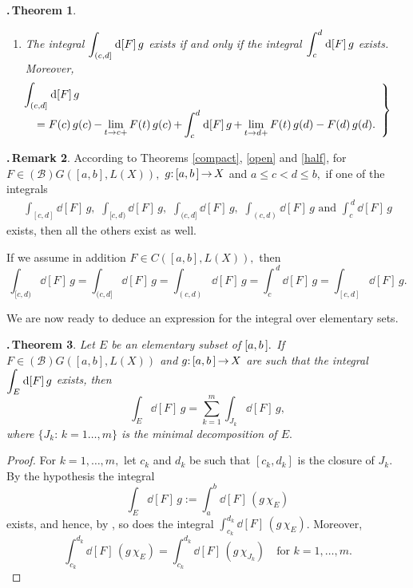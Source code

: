 \documentclass[12pt,twoside]{article}
\numberwithin{equation}{section}
\theoremstyle{plain}
\newtheorem{theorem}{\hskip-1mm.\,Theorem}[section]
\theoremstyle{definition}
\newtheorem{remark}[theorem]{\hskip-1mm.\,Remark}
\begin{document}
{\begin{theorem}
\begin{enumerate}[$(i)$]
\item The integral $\displaystyle\int_{(c,d]}\hskip0.2mm\mbox{\rm d}[F]\,g$ exists if and only if the integral
$\displaystyle\int_{c}^{d}\hskip0.2mm\mbox{\rm d}[F]\,g$ exists. Moreover,
\begin{equation}\label{(c,d]}
\left.\begin{array}{l}\dis\hskip-8mm
    \int_{(c,d]}\dd[F]\,g
   \\\dis\hskip-4mm
    =F(c)\,g(c)\,{-}\lim_{t\to c+}F(t)\,g(c)\,{+}\int_{c}^{d}\dd[F]\,g
                                 \,{+}\lim_{t\to d+}F(t)\,g(d)-F(d)\,g(d).
\end{array}\right\}
\end{equation}
\end{enumerate}
\end{theorem}

\smallskip

\begin{remark}
According to Theorems \ref{compact}, \ref{open} and \ref{half},
for $F\in(\mathcal{B})G([a,b],L(X)),$ $g{:}\,[a,b\,]\,{\to}\,X$ and
$a\le c<d\le b,$
if one of the integrals
\begin{align*}
   \int_{[c,d]}\dd[F]\,g,\,\,\int_{[c,d)}\dd[F]\,g,\,\,\int_{(c,d]}\dd[F]\,g,
   \,\,\int_{(c,d)}\dd[F]\,g \mbox{ \ and \ } \int_c^{\,d}\dd[F]\,g
\end{align*}
exists, then all the others exist as well.

If we assume in addition $F\in C([a,b],L(X)),$ then
\[
   \int_{[c,d)}\dd[F]\,g=\int_{(c,d]}\dd[F]\,g=\int_{(c,d)}\dd[F]\,g=\int_c^{\,d}\dd[F]\,g
   =\int_{[c,d]}\dd[F]\,g.
\]
\end{remark}

\smallskip

We are now ready to deduce an expression for the integral over elementary sets.

\begin{theorem}\label{elementary}
Let $E$ be an elementary subset of $[a,b\,].$ If $F\in(\mathcal{B})G([a,b],L(X))$ and
$g{:}\,[a,b\,]\,{\to}\,X$ are such that the integral $\displaystyle\int_E\hskip0.2mm\mbox{\rm d}[F]\,g$ exists, then
\begin{equation}\label{int-elementary}
   \int_{E}\dd[F]\,g=\sum_{k=1}^{m}\int_{J_k}\dd[F]\,g,
\end{equation}
where $\{J_k{:}\,k=1\dots,m\}$ is the minimal decomposition of $E.$
\end{theorem}
\begin{proof}
For $k=1,\dots,m,$ let $c_k$ and $d_k$ be such that $\left[c_k,d_k\right]$ is
the closure of $J_k.$  By the hypothesis the integral
\[
    \int_{E}\dd[F]\,g:=\int_a^b\dd[F]\,(g\,\chi_{E})
\]
exists, and hence, by \cite[Proposition 8]{Sch1}, so does the integral
$\int_{c_k}^{d_k}\dd[F]\,(g\,\chi_{E})$. Moreover,
\[
  \int_{c_k}^{d_k}\dd[F]\,(g\,\chi_{E})=\int_{c_k}^{d_k}\dd[F]\,(g\,\chi_{J_k})
  \quad\mbox{for \ }k=1,\dots,m.
\]


\end{proof}}
\end{document}
